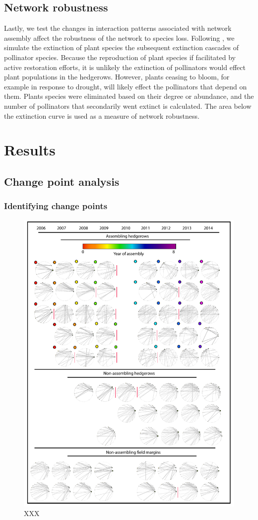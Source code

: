 \documentclass[12pt]{article}
\begin{document}
\subsection*{Network robustness}
Lastly, we test the changes in interaction patterns associated with
network assembly affect the robustness of the network to species
loss. Following \cite{Memmott2004}, we simulate the extinction of
plant species the subsequent extinction cascades of pollinator
species. Because the reproduction of plant species if facilitated by
active restoration efforts, it is unlikely the extinction of
pollinators would effect plant populations in the hedgerows. However,
plants ceasing to bloom, for example in response to drought, will
likely effect the pollinators that depend on them. Plants species were
eliminated based on their degree or abundance, and the number of
pollinators that secondarily went extinct is calculated. The area
below the extinction curve is used as a measure of network robustness.


\section*{Results}
\label{sec:results}
\subsection*{Change point analysis}
\subsubsection*{Identifying change points}


\begin{figure}
  \centering
  \includegraphics[width=.8\textwidth]{../analysis/changePoint/plotting/networks.pdf}
  \caption{XXX}
  \label{fig:changePoints}
\end{figure}
\clearpage
\end{document}
